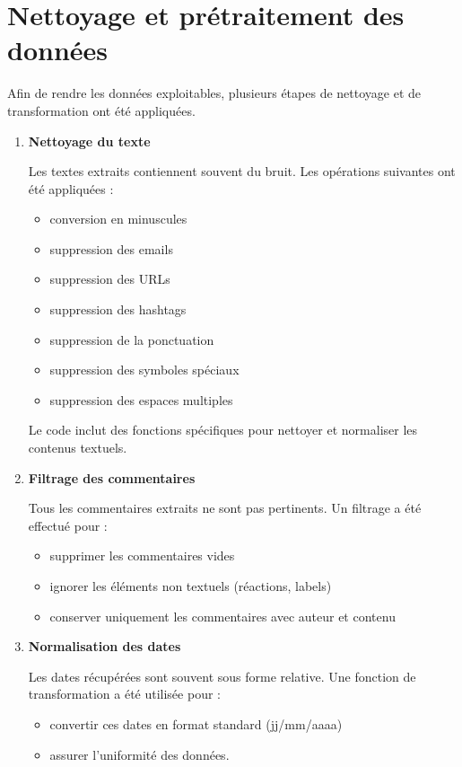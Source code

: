 \documentclass[12pt,a4paper,oneside]{report}
\begin{document}
\section{Nettoyage et prétraitement des données}
Afin de rendre les données exploitables, plusieurs étapes de nettoyage et de transformation ont été appliquées.

\begin{enumerate}
    \item \textbf{Nettoyage du texte}


    Les textes extraits contiennent souvent du bruit. Les opérations suivantes ont été appliquées :
    
    \begin{itemize}
        \item conversion en minuscules 
        \item suppression des emails
        \item suppression des URLs
        \item suppression des hashtags
        \item suppression de la ponctuation
        \item suppression des symboles spéciaux
        \item suppression des espaces multiples
    \end{itemize}
    
    Le code inclut des fonctions spécifiques pour nettoyer et normaliser les contenus textuels.
    
        \item \textbf{Filtrage des commentaires}
    
    Tous les commentaires extraits ne sont pas pertinents. Un filtrage a été effectué pour :
    
    \begin{itemize}
        \item supprimer les commentaires vides
        \item ignorer les éléments non textuels (réactions, labels)
        \item conserver uniquement les commentaires avec auteur et contenu
    \end{itemize}
    
        \item \textbf{Normalisation des dates}
    
    Les dates récupérées sont souvent sous forme relative. Une fonction de transformation a été utilisée pour :
    
    \begin{itemize}
        \item convertir ces dates en format standard (jj/mm/aaaa)
        \item assurer l’uniformité des données.
    \end{itemize}
    

\end{enumerate}
\end{document}
